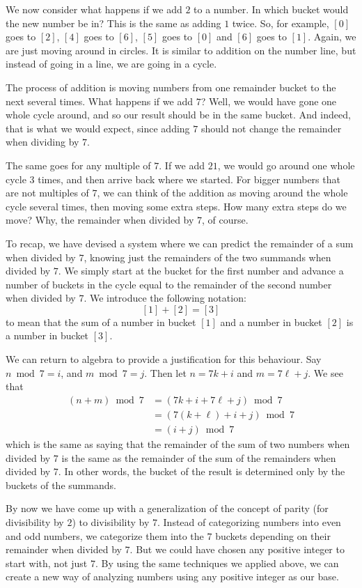 \documentclass[a4paper,10pt]{report}
\begin{document}
We now consider what happens if we add \(2\) to a number. In which bucket would
the new number be in? This is the same as adding \(1\) twice. So, for example,
\([0]\) goes to \([2]\), \([4]\) goes to \([6]\), \([5]\) goes to \([0]\) and
\([6]\) goes to \([1]\). Again, we are just moving around in circles. It is
similar to addition on the number line, but instead of going in a line, we are
going in a cycle.

The process of addition is moving numbers from one remainder bucket to the next
several times. What happens if we add \(7\)? Well, we would have gone one whole
cycle around, and so our result should be in the same bucket. And indeed, that
is what we would expect, since adding \(7\) should not change the remainder
when dividing by \(7\).

The same goes for any multiple of \(7\). If we add \(21\), we would go around
one whole cycle \(3\) times, and then arrive back where we started. For bigger
numbers that are not multiples of \(7\), we can think of the addition as moving
around the whole cycle several times, then moving some extra steps. How many
extra steps do we move? Why, the remainder when divided by \(7\), of course.

To recap, we have devised a system where we can predict the remainder of a sum
when divided by \(7\), knowing just the remainders of the two \glspl{summand}
when divided by \(7\). We simply start at the bucket for the first number and
advance a number of buckets in the cycle equal to the remainder of the second
number when divided by \(7\). We introduce the following notation: \[ [1] + [2] =
[3] \] to mean that the sum of a number in bucket \([1]\) and a number in
bucket \([2]\) is a number in bucket \([3]\).

We can return to algebra to provide a justification for this behaviour. Say \(n
\bmod 7 = i\), and \(m \bmod 7 = j\). Then let \(n = 7k + i\) and \(m = 7\ell +
j\). We see that \begin{align*}
 (n + m) \bmod 7
 &= (7k+i + 7\ell+j) \bmod 7 \\
 &= (7(k+\ell) + i + j) \bmod 7 \\
 &= (i + j) \bmod 7
\end{align*} which is the same as saying that the remainder of the sum of two
numbers when divided by \(7\) is the same as the remainder of the sum of the
remainders when divided by \(7\). In other words, the bucket of the result is
determined only by the buckets of the summands.

By now we have come up with a generalization of the concept of parity (for
divisibility by \(2\)) to divisibility by \(7\). Instead of categorizing
numbers into even and odd numbers, we categorize them into the \(7\) buckets
depending on their remainder when divided by \(7\). But we could have chosen
any positive integer to start with, not just \(7\). By using the same
techniques we applied above, we can create a new way of analyzing numbers using
any positive integer as our base.
\end{document}
